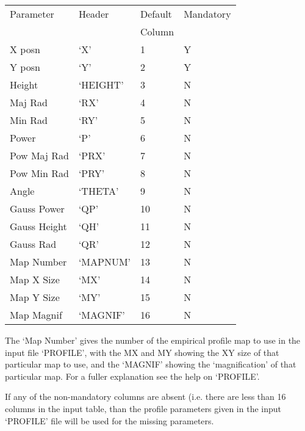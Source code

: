 \begin{small}
{{\vspace*{2mm}\begin{tabular}{|l|l|l|l|}\hline
    Parameter   &    Header     &  Default        &  Mandatory \\
                &               &  Column         & \\   \hline
    X posn      &    `X'        &     1           &     Y \\
    Y posn      &    `Y'        &     2           &     Y \\
    Height      &    `HEIGHT'   &     3           &     N \\
    Maj Rad     &    `RX'       &     4           &     N \\
    Min Rad     &    `RY'       &     5           &     N \\
    Power       &    `P'        &     6           &     N \\
    Pow Maj Rad &    `PRX'      &     7           &     N \\
    Pow Min Rad &    `PRY'      &     8           &     N \\
    Angle       &    `THETA'    &     9           &     N \\
    Gauss Power &    `QP'       &    10           &     N \\
    Gauss Height&    `QH'       &    11           &     N \\
    Gauss Rad   &    `QR'       &    12           &     N \\
    Map Number  &    `MAPNUM'   &    13           &     N \\
    Map X Size  &    `MX'       &    14           &     N \\
    Map Y Size  &    `MY'       &    15           &     N \\
    Map Magnif  &    `MAGNIF'   &    16           &     N \\
\hline\end{tabular}\vspace*{2mm}

   The `Map Number' gives the number of the empirical profile map
   to use in the input file `PROFILE', with the MX and MY showing
   the XY size of that particular map to use, and the `MAGNIF' showing the
   `magnification' of that particular map. For a fuller explanation see
   the help on `PROFILE'.

   If any of the non-mandatory columns are absent (i.e. there are less
   than 16 columns in the input table, than the profile parameters
   given in the input `PROFILE' file will be used for the missing
   parameters.

}}
\end{small}

